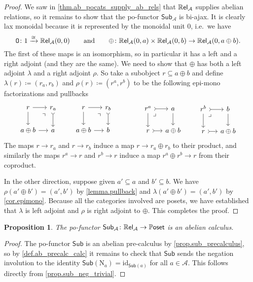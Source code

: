 \documentclass[11pt, oneside, article]{memoir}
\theoremstyle{plain}
\newtheorem{proposition}[theorem]{Proposition}
\theoremstyle{definition}
\theoremstyle{remark}
\newcommand{\const}[1]{\mathtt{#1}}%
\newcommand{\cat}[1]{\mathcal{#1}}%
\newcommand{\Cat}[1]{{\mathsf{#1}}}%
\newcommand{\CCat}[1]{\mathbb{\StrLeft{#1}{1}}\Cat{\StrGobbleLeft{#1}{1}}}%
\newcommand{\funn}[1]{\mathrm{#1}}%
\newcommand{\Funr}[1]{\mathsf{#1}}%
\newcommand{\sub}{\Funr{Sub}}
\newcommand{\id}{\funn{id}}
\newcommand{\Neg}[1]{\funn{N}_{#1}}
\newcommand{\To}[1]{\xrightarrow{#1}}
\renewcommand{\ss}{\subseteq}
\newcommand{\rrel}[1]{\CCat{Rel}_{#1}}
\newcommand{\pposet}{\CCat{Poset}}
\newcommand{\zero}{\const{O}}
\newcommand{\qqand}{\qquad\text{and}\qquad}
\newcommand{\pb}[1][very near start]{\ar[dr, phantom, #1, "\lrcorner"]}
\begin{document}
\begin{proof}
We saw in \cref{thm.ab_pocats_supply_ab_rels} that $\rrel{\cat{A}}$ supplies abelian relations, so it remains to show that the po-functor $\sub_{\cat{A}}$ is bi-ajax. It is clearly lax monoidal because it is represented by the monoidal unit $0$, i.e.\ we have
\[
	\zero\colon 1\To{\cong}\rrel{\cat{A}}(0,0)
	\qqand
	\oplus\colon\rrel{\cat{A}}(0,a)\times\rrel{\cat{A}}(0,b)\to\rrel{\cat{A}}(0,a\oplus b).
\]
The first of these maps is an isomorphism, so in particular it has a left and a right adjoint (and they are the same). We need to show that $\oplus$ has both a left adjoint $\lambda$ and a right adjoint $\rho$. So take a subobject $r\ss a\oplus b$ and define $\lambda(r)\coloneqq (r_a, r_b)$ and $\rho(r)\coloneqq(r^a,r^b)$ to be the following epi-mono factorizations and pullbacks
\[
\begin{tikzcd}[column sep=small]
	r\ar[r]\ar[d]&
	r_a\ar[d, >->]\ar[dl, phantom, near start, "\urcorner"]\\
	a\oplus b\ar[r]&a
\end{tikzcd}
\qquad
\begin{tikzcd}[column sep=small]
	r\ar[r]\ar[d]&
	r_b\ar[d, >->]\ar[dl, phantom, near start, "\urcorner"]\\
	a\oplus b\ar[r]&b
\end{tikzcd}
\qquad\qquad
\begin{tikzcd}[column sep=small]
	r^a\ar[r, >->]\ar[d]\pb&
	a\ar[d]\\
	r\ar[r, >->]&a\oplus b
\end{tikzcd}
\qquad
\begin{tikzcd}[column sep=small]
	r^b\ar[r, >->]\ar[d]\pb&
	b\ar[d]\\
	r\ar[r, >->]&a\oplus b
\end{tikzcd}
\]
The maps $r\to r_a$ and $r\to r_b$ induce a map $r\to r_a\oplus r_b$ to their product, and similarly the maps $r^a\to r$ and $r^b\to r$ induce a map $r^a\oplus r^b\to r$ from their coproduct.

In the other direction, suppose given $a'\ss a$ and $b'\ss b$. We have $\rho(a'\oplus b')=(a',b')$ by \cref{lemma.pullback} and $\lambda(a'\oplus b')=(a',b')$ by \cref{cor.epimono}. Because all the categories involved are posets, we have established that $\lambda$ is left adjoint and $\rho$ is right adjoint to $\oplus$. This completes the proof.
\end{proof}

\begin{proposition}\label{prop.sq_abelian_calculus}
The po-functor $\sub_{\cat{A}}\colon\rrel{\cat{A}}\to\pposet$ is an abelian calculus.
\end{proposition}
\begin{proof}
The po-functor $\sub$ is an abelian pre-calculus by \cref{prop.sub_precalculus}, so by \cref{def.ab_precalc_calc} it remains to check that $\sub$ sends the negation involution to the identity $\sub(\Neg{a})=\id_{\sub(a)}$ for all $a\in\cat{A}$. This follows directly from \cref{prop.sub_neg_trivial}.
\end{proof}
\end{document}
